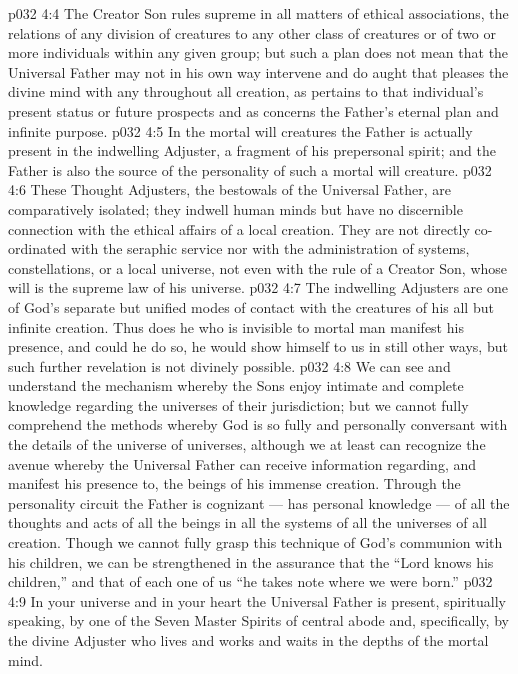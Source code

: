 \vs p032 4:4 The Creator Son rules supreme in all matters of ethical associations, the relations of any division of creatures to any other class of creatures or of two or more individuals within any given group; but such a plan does not mean that the Universal Father may not in his own way intervene and do aught that pleases the divine mind with any  throughout all creation, as pertains to that individual’s present status or future prospects and as concerns the Father’s eternal plan and infinite purpose.
\vs p032 4:5 \pc In the mortal will creatures the Father is actually present in the indwelling Adjuster, a fragment of his prepersonal spirit; and the Father is also the source of the personality of such a mortal will creature.
\vs p032 4:6 \pc These Thought Adjusters, the bestowals of the Universal Father, are comparatively isolated; they indwell human minds but have no discernible connection with the ethical affairs of a local creation. They are not directly co\hyp{}ordinated with the seraphic service nor with the administration of systems, constellations, or a local universe, not even with the rule of a Creator Son, whose will is the supreme law of his universe.
\vs p032 4:7 The indwelling Adjusters are one of God’s separate but unified modes of contact with the creatures of his all but infinite creation. Thus does he who is invisible to mortal man manifest his presence, and could he do so, he would show himself to us in still other ways, but such further revelation is not divinely possible.
\vs p032 4:8 We can see and understand the mechanism whereby the Sons enjoy intimate and complete knowledge regarding the universes of their jurisdiction; but we cannot fully comprehend the methods whereby God is so fully and personally conversant with the details of the universe of universes, although we at least can recognize the avenue whereby the Universal Father can receive information regarding, and manifest his presence to, the beings of his immense creation. Through the personality circuit the Father is cognizant --- has personal knowledge --- of all the thoughts and acts of all the beings in all the systems of all the universes of all creation. Though we cannot fully grasp this technique of God’s communion with his children, we can be strengthened in the assurance that the “Lord knows his children,” and that of each one of us “he takes note where we were born.”
\vs p032 4:9 \pc In your universe and in your heart the Universal Father is present, spiritually speaking, by one of the Seven Master Spirits of central abode and, specifically, by the divine Adjuster who lives and works and waits in the depths of the mortal mind.
